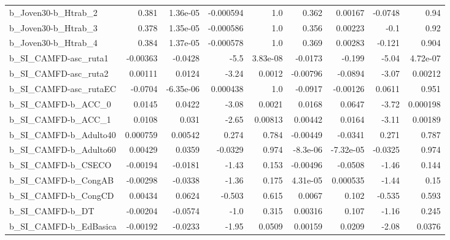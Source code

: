 \begin{tabular}{lrrrrrrrr}
b\_Joven30-b\_Htrab\_2        &       0.381 &     1.36e-05 & -0.000594 &      1.0 &      0.362 &     0.00167 &      -0.0748 &          0.94 \\
b\_Joven30-b\_Htrab\_3        &       0.378 &     1.35e-05 & -0.000586 &      1.0 &      0.356 &     0.00223 &         -0.1 &          0.92 \\
b\_Joven30-b\_Htrab\_4        &       0.384 &     1.37e-05 & -0.000578 &      1.0 &      0.369 &     0.00283 &       -0.121 &         0.904 \\
b\_SI\_CAMFD-asc\_ruta1       &    -0.00363 &      -0.0428 &      -5.5 & 3.83e-08 &    -0.0173 &      -0.199 &        -5.04 &      4.72e-07 \\
b\_SI\_CAMFD-asc\_ruta2       &     0.00111 &       0.0124 &     -3.24 &   0.0012 &   -0.00796 &     -0.0894 &        -3.07 &       0.00212 \\
b\_SI\_CAMFD-asc\_rutaEC      &     -0.0704 &    -6.35e-06 &  0.000438 &      1.0 &    -0.0917 &    -0.00126 &       0.0611 &         0.951 \\
b\_SI\_CAMFD-b\_ACC\_0         &      0.0145 &       0.0422 &     -3.08 &   0.0021 &     0.0168 &      0.0647 &        -3.72 &      0.000198 \\
b\_SI\_CAMFD-b\_ACC\_1         &      0.0108 &        0.031 &     -2.65 &  0.00813 &    0.00442 &      0.0164 &        -3.11 &       0.00189 \\
b\_SI\_CAMFD-b\_Adulto40      &    0.000759 &      0.00542 &     0.274 &    0.784 &   -0.00449 &     -0.0341 &        0.271 &         0.787 \\
b\_SI\_CAMFD-b\_Adulto60      &     0.00429 &       0.0359 &   -0.0329 &    0.974 &   -8.3e-06 &   -7.32e-05 &      -0.0325 &         0.974 \\
b\_SI\_CAMFD-b\_CSECO         &    -0.00194 &      -0.0181 &     -1.43 &    0.153 &   -0.00496 &     -0.0508 &        -1.46 &         0.144 \\
b\_SI\_CAMFD-b\_CongAB        &    -0.00298 &      -0.0338 &     -1.36 &    0.175 &   4.31e-05 &    0.000535 &        -1.44 &          0.15 \\
b\_SI\_CAMFD-b\_CongCD        &     0.00434 &       0.0624 &    -0.503 &    0.615 &     0.0067 &       0.102 &       -0.535 &         0.593 \\
b\_SI\_CAMFD-b\_DT            &    -0.00204 &      -0.0574 &      -1.0 &    0.315 &    0.00316 &       0.107 &        -1.16 &         0.245 \\
b\_SI\_CAMFD-b\_EdBasica      &    -0.00192 &      -0.0233 &     -1.95 &   0.0509 &    0.00159 &      0.0209 &        -2.08 &        0.0376 \\

\end{tabular}
